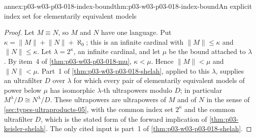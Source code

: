 \begin{annexitem}{annex:p03-w03-p03-018-index-bound}{thm:p03-w03-p03-018-index-bound}{An explicit index set for elementarily equivalent models}
\begin{proof}
Let \(M\equiv N\), so \(M\) and \(N\) have one language.  Put
\(\kappa=\lVert M\rVert+\lVert N\rVert+\aleph_0\); this is an infinite
cardinal with \(\lVert M\rVert\le\kappa\) and \(\lVert N\rVert\le\kappa\).
Let \(\lambda=2^\kappa\), an infinite cardinal, and let \(\mu\) be the bound
attached to \(\lambda\).  By item~4 of \cref{thm:p03-w03-p03-018-mu},
\(\kappa<\mu\).  Hence \(\lVert M\rVert<\mu\) and \(\lVert N\rVert<\mu\).
Part~1 of \cref{thm:p03-w03-p03-018-shelah}, applied to this \(\lambda\),
supplies an ultrafilter \(D\) over \(\lambda\) for which every pair of
elementarily equivalent models of power below \(\mu\) has isomorphic
\(\lambda\)-th ultrapowers modulo \(D\); in particular
\(M^\lambda/D\cong N^\lambda/D\).  These ultrapowers are ultrapowers of
\(M\) and of \(N\) in the sense of \cref{sec:types-ultraproducts-05}, with
the common index set \(2^\kappa\) and the common ultrafilter \(D\), which is
the stated form of the forward implication of \cref{thm:p03-keisler-shelah}.
The only cited input is part~1 of \cref{thm:p03-w03-p03-018-shelah}.
\end{proof}
\end{annexitem}

